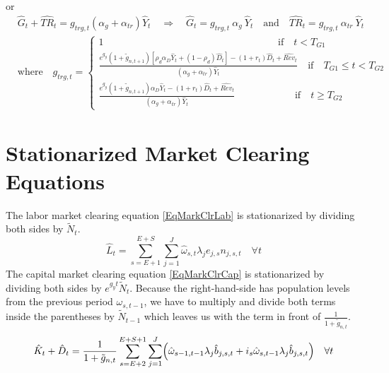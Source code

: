   or
  \begin{equation}\label{EqStnrzClosureRule_TRGt}
      \begin{split}
        &\hat{G}_t + \hat{TR}_t = g_{trg,t}\left(\alpha_g + \alpha_{tr}\right)\hat{Y}_t \quad\Rightarrow\quad \hat{G}_t = g_{trg,t}\:\alpha_g\:\hat{Y}_t \quad\text{and}\quad \hat{TR}_t = g_{trg,t}\:\alpha_{tr}\:\hat{Y}_t \\
        &\text{where}\quad g_{trg,t} =
          \begin{cases}
            1 \qquad\qquad\qquad\qquad\qquad\qquad\qquad\qquad\quad\:\:\,\text{if}\quad t < T_{G1} \\
            \frac{e^{g_y}\left(1 + \tilde{g}_{n,t+1}\right)\left[\rho_{d}\alpha_{D}\hat{Y}_{t} + (1-\rho_{d})\hat{D}_{t}\right] - (1+r_{t})\hat{D}_{t} + \hat{Rev}_{t}}{\left(\alpha_g + \alpha_{tr}\right)\hat{Y}_t} \quad\text{if}\quad T_{G1}\leq t<T_{G2} \\
            \frac{e^{g_y}\left(1 + \tilde{g}_{n,t+1}\right)\alpha_{D}\hat{Y}_{t} - (1+r_{t})\hat{D}_{t} + \hat{Rev}_{t}}{\left(\alpha_g + \alpha_{tr}\right)\hat{Y}_t} \qquad\qquad\quad\:\:\:\:\,\text{if}\quad t \geq T_{G2}
          \end{cases}
      \end{split}
    \end{equation}


\section{Stationarized Market Clearing Equations}\label{SecStnrzMC}

  The labor market clearing equation \eqref{EqMarkClrLab} is stationarized by dividing both sides by $\tilde{N}_t$.
  \begin{equation}\label{EqStnrzMarkClrLab}
    \hat{L}_t = \sum_{s=E+1}^{E+S}\sum_{j=1}^{J} \hat{\omega}_{s,t}\lambda_j e_{j,s}n_{j,s,t} \quad \forall t
  \end{equation}
  The capital market clearing equation \eqref{EqMarkClrCap} is stationarized by dividing both sides by $e^{g_y t}\tilde{N}_t$. Because the right-hand-side has population levels from the previous period $\omega_{s,t-1}$, we have to multiply and divide both terms inside the parentheses by $\tilde{N}_{t-1}$ which leaves us with the term in front of $\frac{1}{1+\tilde{g}_{n,t}}$.
  \begin{equation}\label{EqStnrzMarkClrCap}
    \hat{K}_t + \hat{D}_t = \frac{1}{1 + \tilde{g}_{n,t}}\sum_{s=E+2}^{E+S+1}\sum_{j=1}^{J}\Bigl(\hat{\omega}_{s-1,t-1}\lambda_j \hat{b}_{j,s,t} + i_s\hat{\omega}_{s,t-1}\lambda_j \hat{b}_{j,s,t}\Bigr) \quad \forall t
  \end{equation}

